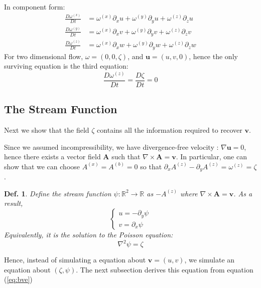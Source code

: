 \documentclass[14pt, twocolumn]{article}
\newtheorem{df}{Def.}
\newenvironment{tbox}{
    \begin{tcolorbox}[sharp corners, colback=white]
    
}{
    \end{tcolorbox}
}
\begin{document}
In component form:
\begin{align*}
    \frac{D\omega^{(x)}}{Dt} &= \omega^{(x)}\partial_x u +
    \omega^{(y)}\partial_y u +
    \omega^{(z)}\partial_z u \\
    \frac{D\omega^{(y)}}{Dt} &= 
    \omega^{(x)}\partial_x v+
    \omega^{(y)}\partial_y v+
    \omega^{(z)}\partial_z v \\
    \frac{D\omega^{(z)}}{Dt} &= 
    \omega^{(x)}\partial_x w +
    \omega^{(y)}\partial_y w +\omega^{(z)}\partial_z w 
\end{align*}
For two dimensional flow, $\omega=(0,0,\zeta)$, and $\mathbf{u}=(u,v,0)$, hence the only surviving equation is the third equation:
\begin{equation}
    \frac{D\omega^{(z)}}{Dt}=\frac{D\zeta}{Dt}=0
    \label{eq:bve}
\end{equation} 
\subsection{The Stream Function}
Next we show that the field $\zeta$ contains all the information required to recover $\mathbf{v}$.

Since we assumed incompressibility, we have divergence-free velocity : $\nabla \mathbf{u}=0$, hence there exists a vector field $\mathbf{A}$ such that $\nabla \times \mathbf{A} =\mathbf{v}$. In particular, one can show that  we can choose $A^{(x)}=A^{(b)}=0$ so that $\partial_x A^{(z)}-\partial_y A^{(z)}=\omega^{(z)}=\zeta$. 

\begin{tbox}
    \begin{df}
        Define the \textit{stream function}  $\psi:\mathbb{R}^2\to\mathbb{R}$ as $-A^{(z)}$ where $\nabla \times \mathbf{A}=\mathbf{v}$. As a result, 
        $$
        \begin{cases}
            u= - \partial_y \psi \\
            v=\partial_x \psi
        \end{cases}
        $$
        Equivalently, it is the solution to the Poisson equation:
        \begin{equation}
            \nabla ^2 \psi = \zeta 
        \end{equation}
    \end{df}
\end{tbox}

Hence, instead of simulating a equation about $\mathbf{v}=(u,v)$, we simulate an equation about $(\zeta,\psi)$. The next subsection derives this equation from equation (\ref{eq:bve})
\end{document}
